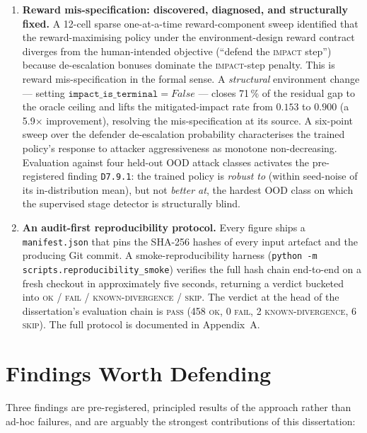 \begin{enumerate}
    \item \textbf{Reward mis-specification: discovered, diagnosed, and structurally fixed.} A 12-cell sparse one-at-a-time reward-component sweep identified that the reward-maximising policy under the environment-design reward contract diverges from the human-intended objective (``defend the \textsc{impact} step'') because de-escalation bonuses dominate the \textsc{impact}-step penalty. This is reward mis-specification in the formal sense. A \emph{structural} environment change --- setting $\texttt{impact\_is\_terminal}=\mathit{False}$ --- closes 71\,\% of the residual gap to the oracle ceiling and lifts the mitigated-impact rate from $0.153$ to $0.900$ (a 5.9$\times$ improvement), resolving the mis-specification at its source. A six-point sweep over the defender de-escalation probability characterises the trained policy's response to attacker aggressiveness as monotone non-decreasing. Evaluation against four held-out OOD attack classes activates the pre-registered finding \texttt{D7.9.1}: the trained policy is \emph{robust to} (within seed-noise of its in-distribution mean), but not \emph{better at}, the hardest OOD class on which the supervised stage detector is structurally blind.

    \item \textbf{An audit-first reproducibility protocol.} Every figure ships a \texttt{manifest.json} that pins the SHA-256 hashes of every input artefact and the producing Git commit. A smoke-reproducibility harness (\texttt{python -m scripts.reproducibility\_smoke}) verifies the full hash chain end-to-end on a fresh checkout in approximately five seconds, returning a verdict bucketed into \textsc{ok} / \textsc{fail} / \textsc{known-divergence} / \textsc{skip}. The verdict at the head of the dissertation's evaluation chain is \textsc{pass} (458 \textsc{ok}, 0 \textsc{fail}, 2 \textsc{known-divergence}, 6 \textsc{skip}). The full protocol is documented in Appendix~A.
\end{enumerate}

\section{Findings Worth Defending}\label{sec:findings}
Three findings are pre-registered, principled results of the approach rather than ad-hoc failures, and are arguably the strongest contributions of this dissertation:

